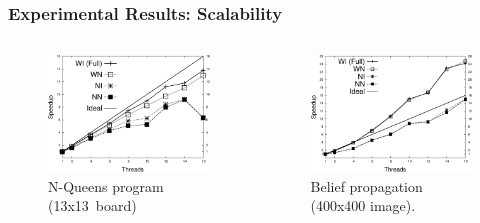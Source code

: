 \documentclass{beamer}
\begin{document}
\begin{frame}[fragile]
   \frametitle{Experimental Results: Scalability}
   \begin{columns}[t]
      \begin{figure}[b]
         \includegraphics[width=\textwidth]{../figures/results-13queens.pdf}
         \caption{N-Queens program (13x13~board)}
      \end{figure}
      \begin{figure}[b]
         \includegraphics[width=\textwidth]{../figures/results-bp.pdf}
         \caption{Belief propagation (400x400 image).}
      \end{figure}
   \end{columns}
\end{frame}
\end{document}
